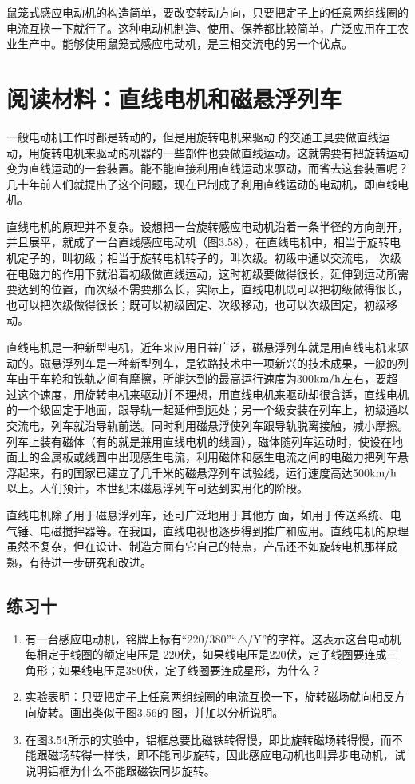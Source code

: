 鼠笼式感应电动机的构造简单，要改变转动方向，只要把定子上的任意两组线圈的电流互换一下就行了。这种电动机制造、使用、保养都比较简单，广泛应用在工农业生产中。能够使用鼠笼式感应电动机，是三相交流电的另一个优点。

\section*{阅读材料：直线电机和磁悬浮列车}

一般电动机工作时都是转动的，但是用旋转电机来驱动
的交通工具要做直线运动，用旋转电机来驱动的机器的一些部件也要做直线运动。这就需要有把旋转运动变为直线运动的一套装置。能不能直接利用直线运动来驱动，而省去这套装置呢？几十年前人们就提出了这个问题，现在已制成了利用直线运动的电动机，即直线电机。

直线电机的原理并不复杂。设想把一台旋转感应电动机沿着一条半径的方向剖开，并且展平，就成了一台直线感应电动机（图3.58），在直线电机中，相当于旋转电机定子的，叫初级；相当于旋转电机转子的，叫次级。初级中通以交流电，
次级在电磁力的作用下就沿着初级做直线运动，这时初级要做得很长，延伸到运动所需要达到的位置，而次级不需要那么长，实际上，直线电机既可以把初级做得很长，也可以把次级做得很长；既可以初级固定、次级移动，也可以次级固定，初级移动。

直线电机是一种新型电机，近年来应用日益广泛，磁悬浮列车就是用直线电机来驱动的。磁悬浮列车是一种新型列车，是铁路技术中一项新兴的技术成果，一般的列车由于车轮和铁轨之间有摩擦，所能达到的最高运行速度为300$\text{km}/\text{h}$左右，要超过这个速度，用旋转电机来驱动并不理想，用直线电机来驱动却很含适，直线电机的一个级固定于地面，跟导轨一起延伸到远处；另一个级安装在列车上，初级通以交流电，列车就沿导轨前送。同时利用磁悬浮使列车跟导轨脱离接触，减小摩擦。列车上装有磁体（有的就是兼用直线电机的线園），磁体随列车运动时，使设在地面上的金属板或线圆中出现感生电流，利用磁体和感生电流之间的电磁力把列车悬浮起来，有的国家已建立了几千米的磁悬浮列车试验线，运行速度高达500$\text{km}/\text{h}$以上。人们预计，本世纪末磁悬浮列车可达到实用化的阶段。

直线电机除了用于磁悬浮列车，还可广泛地用于其他方
面，如用于传送系统、电气锤、电磁搅拌器等。在我国，直线电视也逐步得到推广和应用。直线电机的原理虽然不复杂，但在设计、制造方面有它自己的特点，产品还不如旋转电机那样成熟，有待进一步研究和改进。

\subsection*{练习十}
\begin{enumerate}
    \item 有一台感应电动机，铭牌上标有“220/380”“$\triangle$/Y”的字祥。这表示这台电动机每相定于线圈的额定电压是 220伏，如果线电压是220伏，定子线圈要连成三角形；如果线电压是380伏，定子线圈要连成星形，为什么？
    \item 实验表明：只要把定子上任意两组线圈的电流互换一下，旋转磁场就向相反方向旋转。画出类似于图3.56的
    图，并加以分析说明。
    \item 在图3.54所示的实验中，铝框总要比磁铁转得慢，即比旋转磁场转得慢，而不能跟磁场转得一样快，即不能同步旋转，因此感应电动机也叫异步电动机，试说明铝框为什么不能跟磁铁同步旋转。
\end{enumerate}

